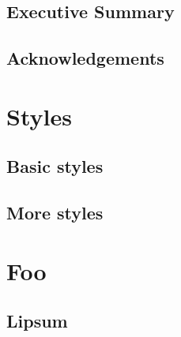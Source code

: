 \documentclass[a4paper,10pt,onecolumn]{book}
\begin{document}
\pagestyle{empty}


\cleardoublepage

\chapter*{}

\cleardoublepage

\pagestyle{plain}

\chapter*{Executive Summary}


\chapter*{Acknowledgements}


\tableofcontents
\listoffigures
\listoftables
\lstlistoflistings
\cleardoublepage

\pagestyle{headings}
\pagestyle{fancy}

\part{Styles}

\chapter{Basic styles}
\label{chapter:basic-styles}


\chapter{More styles}
\label{chapter:more-styles}


\part{Foo}

\chapter{Lipsum}
\label{chapter:lipsum}

\end{document}
